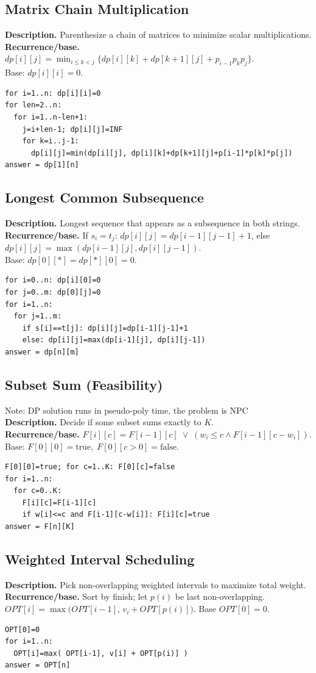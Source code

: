 \documentclass[9pt]{extarticle}
\begin{document}
\subsection{Matrix Chain Multiplication}
\textbf{Description.} Parenthesize a chain of matrices to minimize scalar multiplications.\\
\textbf{Recurrence/base.} \(dp[i][j]=\min_{i\le k<j}\{dp[i][k]+dp[k+1][j]+p_{i-1}p_kp_j\}\).\\  
Base: \(dp[i][i]=0\).
\begin{verbatim}
for i=1..n: dp[i][i]=0
for len=2..n:
  for i=1..n-len+1:
    j=i+len-1; dp[i][j]=INF
    for k=i..j-1:
      dp[i][j]=min(dp[i][j], dp[i][k]+dp[k+1][j]+p[i-1]*p[k]*p[j])
answer = dp[1][n]
\end{verbatim}

\subsection{Longest Common Subsequence}
\textbf{Description.} Longest sequence that appears as a subsequence in both strings.\\
\textbf{Recurrence/base.} If \(s_i=t_j\): \(dp[i][j]=dp[i-1][j-1]+1\), else \(dp[i][j]=\max(dp[i-1][j],dp[i][j-1])\).  \\
Base: \(dp[0][*]=dp[*][0]=0\).
\begin{verbatim}
for i=0..n: dp[i][0]=0
for j=0..m: dp[0][j]=0
for i=1..n:
  for j=1..m:
    if s[i]==t[j]: dp[i][j]=dp[i-1][j-1]+1
    else: dp[i][j]=max(dp[i-1][j], dp[i][j-1])
answer = dp[n][m]
\end{verbatim}

\subsection{Subset Sum (Feasibility)}
Note: DP solution runs in pseudo-poly time, the problem is NPC\\
\textbf{Description.} Decide if some subset sums exactly to \(K\).\\
\textbf{Recurrence/base.} \(F[i][c]=F[i-1][c]\;\lor\;(w_i\le c \land F[i-1][c-w_i])\).  \\
Base: \(F[0][0]=\text{true},\;F[0][c>0]=\text{false}\).
\begin{verbatim}
F[0][0]=true; for c=1..K: F[0][c]=false
for i=1..n:
  for c=0..K:
    F[i][c]=F[i-1][c]
    if w[i]<=c and F[i-1][c-w[i]]: F[i][c]=true
answer = F[n][K]
\end{verbatim}

\subsection{Weighted Interval Scheduling}
\textbf{Description.} Pick non-overlapping weighted intervals to maximize total weight.\\
\textbf{Recurrence/base.} Sort by finish; let \(p(i)\) be last non-overlapping.  \\
\(OPT[i]=\max\big(OPT[i-1],\,v_i+OPT[p(i)]\big)\). Base \(OPT[0]=0\).\\
\begin{verbatim}
OPT[0]=0
for i=1..n:
  OPT[i]=max( OPT[i-1], v[i] + OPT[p(i)] )
answer = OPT[n]
\end{verbatim}
\end{document}
